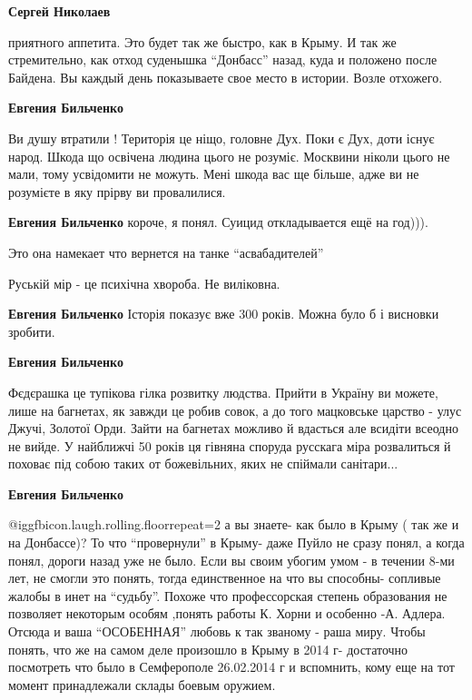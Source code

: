 \begin{itemize}
\begin{itemize}
\textbf{Сергей Николаев} 

приятного аппетита. Это будет так же быстро, как в Крыму. И так же
стремительно, как отход суденышка \enquote{Донбасс} назад, куда и положено после
Байдена. Вы каждый день показываете свое место в истории. Возле отхожего.

\textbf{Евгения Бильченко} 

Ви душу втратили ! Територія це ніщо, головне Дух. Поки є Дух, доти існує
народ. Шкода що освічена людина цього не розуміє. Москвини ніколи цього не
мали, тому усвідомити не можуть. Мені шкода вас ще більше, адже ви не розумієте
в яку прірву ви провалилися.


\textbf{Евгения Бильченко} короче, я понял. Суицид откладывается ещё на год))).

Это она намекает что вернется на танке \enquote{асвабадителей}

Руській мір - це психічна хвороба.
Не виліковна.

\textbf{Евгения Бильченко} Історія показує вже 300 років. Можна було б і висновки зробити.

\textbf{Евгения Бильченко} 

Фєдєрашка це тупікова гілка розвитку людства. Прийти в Україну ви можете, лише
на багнетах, як завжди це робив совок, а до того мацковське царство - улус
Джучі, Золотої Орди. Зайти на багнетах можливо й вдасться але всидіти всеодно
не вийде. У найближчі 50 років ця гівняна споруда русскага міра розвалиться й
поховає під собою таких от божевільних, яких не спіймали санітари...

\textbf{Евгения Бильченко}  

@igg{fbicon.laugh.rolling.floor}{repeat=2}  а вы знаете- как было в Крыму ( так
же и на Донбассе)? То что \enquote{провернули} в Крыму- даже Пуйло не сразу понял, а
когда понял, дороги назад уже не было. Если вы своим убогим умом - в течении
8-ми лет, не смогли это понять, тогда единственное на что вы способны-
сопливые жалобы в инет на \enquote{судьбу}. Похоже что профессорская степень
образования не позволяет некоторым особям ,понять работы К. Хорни и особенно
-А. Адлера. Отсюда и ваша \enquote{ОСОБЕННАЯ} любовь к так званому - раша миру. Чтобы
понять, что же на самом деле произошло в Крыму в 2014 г- достаточно посмотреть
что было в Семферополе 26.02.2014 г и вспомнить, кому еще на тот момент
принадлежали склады боевым оружием.


\end{itemize}
\end{itemize}

